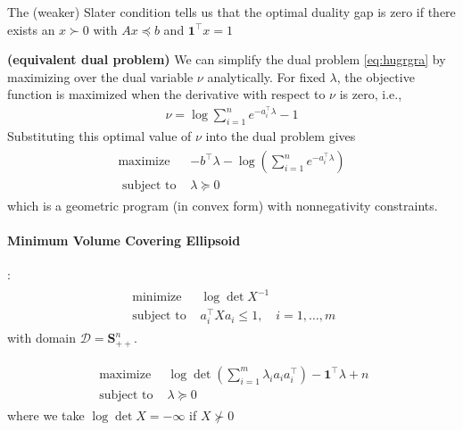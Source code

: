 \documentclass{article}
\newcommand{\bfs}[1]{\textbf{({#1}) }}
\begin{document}

The (weaker) Slater condition tells us that the optimal duality gap is zero if there exists an $x \succ 0$ with $A x \preceq b$ and $\mathbf{1}^{\top} x=1$
\begin{rema}\bfs{equivalent dual problem}
We can simplify the dual problem \cref{eq:hugrgra} by maximizing over the dual variable $\nu$ analytically. For fixed $\lambda$, the objective function is maximized when the derivative with respect to $\nu$ is zero, i.e.,
\begin{align*}
\nu=\log \sum_{i=1}^{n} e^{-a_{i}^{\top} \lambda}-1
\end{align*}
Substituting this optimal value of $\nu$ into the dual problem gives
\begin{align*}
\begin{array}{ll}
\operatorname{maximize} & -b^{\top} \lambda-\log \left(\sum_{i=1}^{n} e^{-a_{i}^{\top} \lambda}\right) \\
\text { subject to } & \lambda \succeq 0
\end{array}
\end{align*}
which is a geometric program (in convex form) with nonnegativity constraints.
\end{rema}

\paragraph{Minimum Volume Covering Ellipsoid}
:
\begin{align}
\begin{array}{ll}
\text { minimize } & \log \operatorname{det} X^{-1} \\
\text { subject to } & a_{i}^{\top} X a_{i} \leq 1, \quad i=1, \ldots, m
\end{array}\label{eq:hiebjyt}
\end{align}
with domain $\mathcal{D}=\mathbf{S}_{++}^{n}$. 

\begin{align*}
\begin{array}{ll}
\text { maximize } & \log \operatorname{det}\left(\sum_{i=1}^{m} \lambda_{i} a_{i} a_{i}^{\top}\right)-\mathbf{1}^{\top} \lambda+n \\
\text { subject to } & \lambda \succeq 0
\end{array}
\end{align*}
where we take $\log \operatorname{det} X=-\infty$ if $X \nsucc 0$
\end{document}
